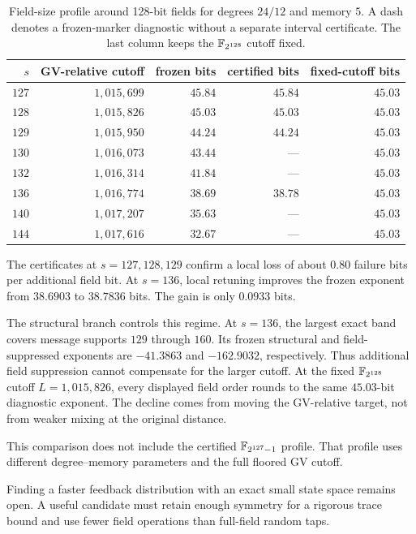 \begin{table}[ht]
\centering
\caption{Field-size profile around 128-bit fields for degrees $24/12$ and
memory $5$.  A dash denotes a frozen-marker diagnostic without a separate
interval certificate.  The last column keeps the $\mathbb F_{2^{128}}$ cutoff
fixed.}
\label{tab:field-size-diagnostic}
\begin{tabular}{@{}rrrrr@{}}
\toprule
$s$ & GV-relative cutoff & frozen bits & certified bits & fixed-cutoff bits \\
\midrule
$127$ & $1{,}015{,}699$ & $45.84$ & $45.84$ & $45.03$ \\
$128$ & $1{,}015{,}826$ & $45.03$ & $45.03$ & $45.03$ \\
$129$ & $1{,}015{,}950$ & $44.24$ & $44.24$ & $45.03$ \\
$130$ & $1{,}016{,}073$ & $43.44$ & --- & $45.03$ \\
$132$ & $1{,}016{,}314$ & $41.84$ & --- & $45.03$ \\
$136$ & $1{,}016{,}774$ & $38.69$ & $38.78$ & $45.03$ \\
$140$ & $1{,}017{,}207$ & $35.63$ & --- & $45.03$ \\
$144$ & $1{,}017{,}616$ & $32.67$ & --- & $45.03$ \\
\bottomrule
\end{tabular}
\end{table}

The certificates at $s=127,128,129$ confirm a local loss of about $0.80$
failure bits per additional field bit.  At $s=136$, local retuning improves
the frozen exponent from $38.6903$ to $38.7836$ bits.  The gain is only
$0.0933$ bits.

The structural branch controls this regime.  At $s=136$, the largest exact
band covers message supports $129$ through $160$.  Its frozen structural and
field-suppressed exponents are $-41.3863$ and $-162.9032$, respectively.
Thus additional field suppression cannot compensate for the larger cutoff.
At the fixed $\mathbb F_{2^{128}}$ cutoff $L=1{,}015{,}826$, every displayed field
order rounds to the same $45.03$-bit diagnostic exponent.  The decline comes
from moving the GV-relative target, not from weaker mixing at the original
distance.

This comparison does not include the certified $\mathbb F_{2^{127}-1}$ profile.
That profile uses different degree--memory parameters and the full floored
GV cutoff.

Finding a faster feedback distribution with an exact small state space
remains open.  A useful candidate must retain enough symmetry for a rigorous
trace bound and use fewer field operations than full-field random taps.

